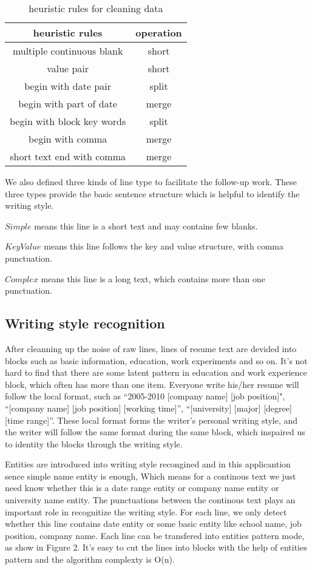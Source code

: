 \documentclass{acm_proc_article-sp}
\begin{document}
\begin{table}
\centering
\caption{heuristic rules for cleaning data}
\begin{tabular}{|c|c|} \hline
heuristic rules & operation\\ \hline
multiple continuous blank & short \\ \hline
value pair & short \\ \hline
begin with date pair & split\\ \hline
begin with part of date & merge \\ \hline
begin with block key words & split \\ \hline
begin with comma & merge\\ \hline
short text end with comma & merge \\
\hline\end{tabular}
\end{table}

We also defined three kinds of line type to facilitate the follow-up work. These three types provide the basic sentence structure which is helpful to identify the writing style.

$Simple$ means this line is a short text and may contains few blanks. 

$KeyValue$ means this line follows the key and value structure, with comma punctuation.  

$Complex$ means this line is a long text, which contains more than one punctuation. 

\subsection{Writing style recognition}

After cleanning up the noise of raw lines, lines of resume text are devided into blocks such as basic information, education, work experiments and so on. 
It's not hard to find that there are some latent pattern in education and work experience block, which often has more than one item. 
Everyone write his/her resume will follow the local format, such as ``2005-2010 [company name] [job position]", ``[company name] [job position] [working time]'', ``[university] [major] [degree] [time range]''. 
These local format forms the writer's personal writing style, and the writer will follow the same format during the same block, which inspaired us to identity the blocks through the writing style.

Entities are introduced into writing style recongined and in this applicantion sence simple name entity is enough, Which means for a continous text we just need know whether this is a date range entity or company name entity or university name entity.
The punctuations between the continous text plays an important role in recognitize the writing style. 
For each line, we only detect whether this line contains date entity or some basic entity like school name, job position, company name.
Each line can be transfered into entities pattern mode, as show in Figure 2. 
It's easy to cut the lines into blocks with the help of entities pattern and the algorithm complexty is O(n).
\end{document}
